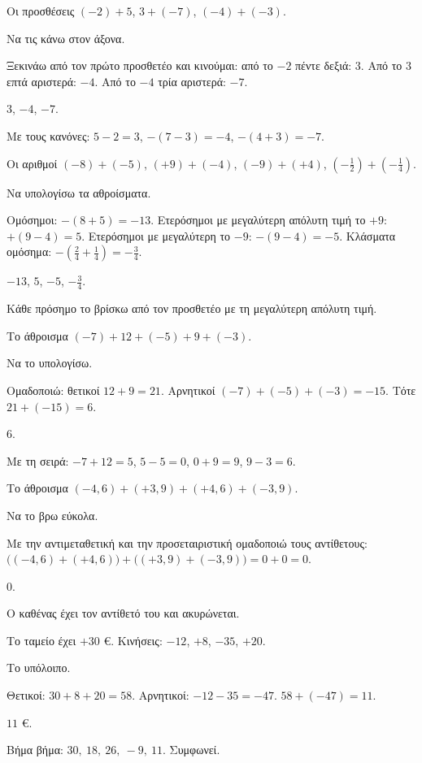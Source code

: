 
\tixero Οι προσθέσεις $(-2)+5$, $3+(-7)$, $(-4)+(-3)$.\par
\tithelo Να τις κάνω στον άξονα.\par
\possindeo Ξεκινάω από τον πρώτο προσθετέο και κινούμαι: από το $-2$ πέντε δεξιά: $3$. Από το $3$ επτά αριστερά: $-4$. Από το $-4$ τρία αριστερά: $-7$.\par
\apantisi $3$, $-4$, $-7$.\par
\elegxos Με τους κανόνες: $5-2=3$, $-(7-3)=-4$, $-(4+3)=-7$.

\tixero Οι αριθμοί $(-8)+(-5)$, $(+9)+(-4)$, $(-9)+(+4)$, $\left(-\frac{1}{2}\right)+\left(-\frac{1}{4}\right)$.\par
\tithelo Να υπολογίσω τα αθροίσματα.\par
\possindeo Ομόσημοι: $-(8+5)=-13$. Ετερόσημοι με μεγαλύτερη απόλυτη τιμή το $+9$: $+(9-4)=5$. Ετερόσημοι με μεγαλύτερη το $-9$: $-(9-4)=-5$. Κλάσματα ομόσημα: $-\left(\frac{2}{4}+\frac{1}{4}\right)=-\frac{3}{4}$.\par
\apantisi $-13$, $5$, $-5$, $-\frac{3}{4}$.\par
\elegxos Κάθε πρόσημο το βρίσκω από τον προσθετέο με τη μεγαλύτερη απόλυτη τιμή.

\tixero Το άθροισμα $(-7)+12+(-5)+9+(-3)$.\par
\tithelo Να το υπολογίσω.\par
\possindeo Ομαδοποιώ: θετικοί $12+9=21$. Αρνητικοί $(-7)+(-5)+(-3)=-15$. Τότε $21+(-15)=6$.\par
\apantisi $6$.\par
\elegxos Με τη σειρά: $-7+12=5$, $5-5=0$, $0+9=9$, $9-3=6$.

\tixero Το άθροισμα $(-4{,}6)+(+3{,}9)+(+4{,}6)+(-3{,}9)$.\par
\tithelo Να το βρω εύκολα.\par
\possindeo Με την αντιμεταθετική και την προσεταιριστική ομαδοποιώ τους αντίθετους: $\big((-4{,}6)+(+4{,}6)\big)+\big((+3{,}9)+(-3{,}9)\big)=0+0=0$.\par
\apantisi $0$.\par
\elegxos Ο καθένας έχει τον αντίθετό του και ακυρώνεται.

\tixero Το ταμείο έχει $+30$ €. Κινήσεις: $-12$, $+8$, $-35$, $+20$.\par
\tithelo Το υπόλοιπο.\par
\possindeo Θετικοί: $30+8+20=58$. Αρνητικοί: $-12-35=-47$. $58+(-47)=11$.\par
\apantisi $11$ €.\par
\elegxos Βήμα βήμα: $30,\ 18,\ 26,\ -9,\ 11$. Συμφωνεί.


